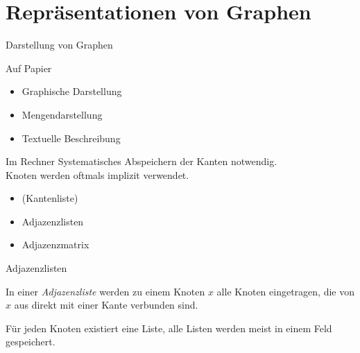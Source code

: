 \section{Repräsentationen von Graphen}
\begin{frame}{Darstellung von Graphen}
	\begin{block}{Auf Papier}
		\begin{itemize}
			\item Graphische Darstellung
			\item Mengendarstellung
			\item Textuelle Beschreibung
		\end{itemize}
	\end{block}

	\pause
	\begin{block}{Im Rechner}
		Systematisches Abspeichern der Kanten notwendig.\\
		Knoten werden oftmals implizit verwendet.
		\begin{itemize}
			\item (Kantenliste)
			\item Adjazenzlisten
			\item Adjazenzmatrix
		\end{itemize}
	\end{block}
\end{frame}

\begin{frame}{Adjazenzlisten}
	\begin{Definition}
		In einer \emph{Adjazenzliste} werden zu einem Knoten $x$ alle Knoten eingetragen, die von $x$ aus direkt mit einer Kante verbunden sind.
	\end{Definition}

	\pause
	Für jeden Knoten existiert eine Liste, alle Listen werden meist in einem Feld gespeichert.
\end{frame}

